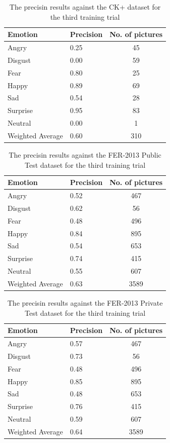 \documentclass[runningheads,a4paper,11pt]{report}
\begin{document}
\begin{table}[htbp]
	\caption{The precisin results against the CK+ dataset for the third training trial}
	\label{fer_training_28k_001_ckp}
		\begin{center}
			\begin{tabular}{p{110pt}p{110pt}c}
				\textbf{Emotion}& \textbf{Precision}& \textbf{No. of pictures} \\
				\hline\hline
				Angry& 0.25& 45 \\
				Disgust& 0.00& 59 \\
				Fear& 0.80& 25 \\
				Happy& 0.89& 69 \\
				Sad& 0.54& 28 \\
				Surprise& 0.95& 83 \\
				Neutral& 0.00& 1 \\
				\hline
				Weighted Average& 0.60& 310
			\end{tabular}
		\end{center}
\end{table}
\begin{table}[htbp]
	\caption{The precisin results against the FER-2013 Public Test dataset for the third training trial}
	\label{fer_training_28k_001_public_test}
		\begin{center}
			\begin{tabular}{p{110pt}p{110pt}c}
				\textbf{Emotion}& \textbf{Precision}& \textbf{No. of pictures} \\
				\hline\hline
				Angry& 0.52& 467 \\
				Disgust& 0.62& 56 \\
				Fear& 0.48& 496 \\
				Happy& 0.84& 895 \\
				Sad& 0.54& 653 \\
				Surprise& 0.74& 415 \\
				Neutral& 0.55& 607 \\
				\hline
				Weighted Average& 0.63 &3589
			\end{tabular}
		\end{center}
\end{table}
\begin{table}[htbp]
	\caption{The precisin results against the FER-2013 Private Test dataset for the third training trial}
	\label{fer_training_28k_001_private_test}
		\begin{center}
			\begin{tabular}{p{110pt}p{110pt}c}
				\textbf{Emotion}& \textbf{Precision}& \textbf{No. of pictures} \\
				\hline\hline
				Angry& 0.57& 467 \\
				Disgust& 0.73& 56 \\
				Fear& 0.48& 496 \\
				Happy& 0.85& 895 \\
				Sad& 0.48& 653 \\
				Surprise& 0.76& 415 \\
				Neutral& 0.59& 607 \\
				\hline
				Weighted Average& 0.64 &3589
			\end{tabular}
		\end{center}
\end{table}
\end{document}

